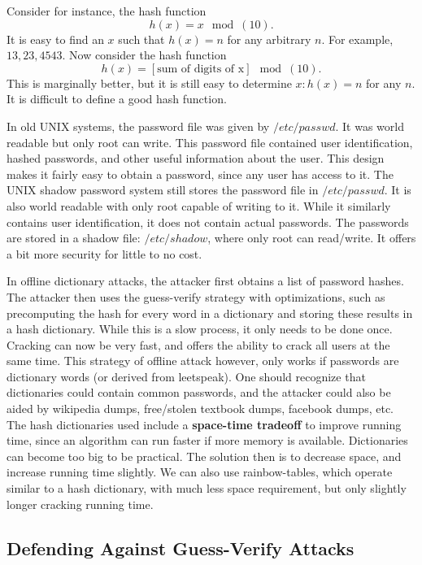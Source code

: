 \documentclass[11pt]{article}
\theoremstyle{plain} %
\theoremstyle{definition}
\theoremstyle{example}
\theoremstyle{remark}
\begin{document}
Consider for instance, the hash function $$h(x) = x \mod(10).$$
It is easy to find an $x$ such that $h(x) =n$ for any arbitrary $n$. For example, $13, 23, 4543$. Now consider the hash function 
$$h(x) = [\text{sum of digits of x}]\mod(10).$$
This is marginally better, but it is still easy to determine $x:h(x)=n$ for any $n$. It is difficult to define a good hash function. 

In old UNIX systems, the password file was given by $/etc/passwd$. It was world readable but only root can write. This password file contained user identification, hashed passwords, and other useful information about the user. This design makes it fairly easy to obtain a password, since any user has access to it. The UNIX shadow password system still stores the password file in $/etc/passwd$. It is also world readable with only root capable of writing to it. While it similarly contains user identification, it does not contain actual passwords. The passwords are stored in a shadow file: $/etc/shadow$, where only root can read/write. It offers a bit more security for little to no cost. 

In offline dictionary attacks, the attacker first obtains a list of password hashes. The attacker then uses the guess-verify strategy with optimizations, such as precomputing the hash for every word in a dictionary and storing these results in a hash dictionary. While this is a slow process, it only needs to be done once. Cracking can now be very fast, and offers the ability to crack all users at the same time. This strategy of offline attack however, only works if passwords are dictionary words (or derived from leetspeak). One should recognize that dictionaries could contain common passwords, and the attacker could also be aided by wikipedia dumps, free/stolen textbook dumps, facebook dumps, etc. The hash dictionaries used include a \textbf{space-time tradeoff} to improve running time, since an algorithm can run faster if more memory is available. Dictionaries can become too big to be practical. The solution then is to decrease space, and increase running time slightly. We can also use rainbow-tables, which operate similar to a hash dictionary, with much less space requirement, but only slightly longer cracking running time.

\subsection{Defending Against Guess-Verify Attacks}
\end{document}
